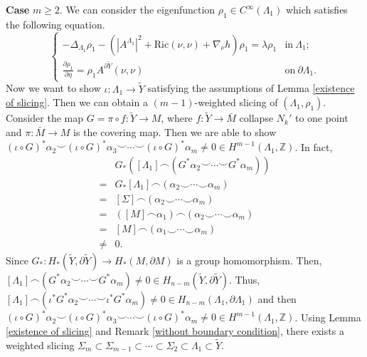 \documentclass[11pt,letterpaper]{amsart}
\theoremstyle{definition}
\theoremstyle{remark}
\numberwithin{equation}{section}
\begin{document}
    \textbf{Case} $m\geq 2$. We can consider the eigenfunction $\rho_{1}\in C^{\infty} (\Lambda_{1})$ which satisfies the following equation.
\[
\left\{
\begin{array}{cc}
     -\Delta_{\Lambda_{1}}\rho_{1}-(|A^{\Lambda_{1}}|^2+\text{Ric}(\nu,\nu)+\nabla_{\nu}h)\rho_{1} = \lambda \rho_{1} & \text{in}\ \Lambda_{1}; \\
     \frac{\partial \rho_{1}}{\partial \eta} = \rho_{1}A^{\partial \tilde{Y}}(\nu,\nu)& \text{on}\ \partial \Lambda_{1} .
\end{array}\right.
\]
Now we want to show $\iota:\Lambda_{1}\rightarrow \tilde{Y}$ satisfying the assumptions of Lemma \ref{existence of slicing}. Then we can obtain a $(m-1)$-weighted slicing of $(\Lambda_{1},\rho_{1})$. Consider the map $G=\pi \circ f: \tilde{Y}\rightarrow M$, where $f:\tilde{Y}\rightarrow \bar{M}$ collapse $N_{k}'$ to one point and $\pi:\bar{M}\rightarrow M$ is the covering map.  Then we are able to show $(\iota\circ G)^{*}\alpha_{2}\smile (\iota\circ G)^{*}\alpha_{3}\smile \cdots \smile (\iota\circ G)^{*}\alpha_{m}\neq 0\in H^{m-1}(\Lambda_{1},\mathbb{Z})$. 
In fact,
\[
\begin{aligned}
    & G_{*}([\Lambda_{1}] \frown (G^{*}\alpha_{2}\smile \cdots \smile G^{*}\alpha_{m}))\\
    =& G_{*}[\Lambda_{1}]\frown (\alpha_{2}\smile \cdots \smile \alpha_{m})\\
    =& [\Sigma]\frown (\alpha_{2}\smile \cdots \smile \alpha_{m})\\
    =& ([M]\frown \alpha_1) \frown(\alpha_{2}\smile \cdots \smile \alpha_{m})\\
    =&[M]\frown (\alpha_{1}\smile \cdots \smile \alpha_{m})\\
    \neq & 0.
\end{aligned}
\]
Since $G_{*}: H_{*}(\tilde{Y},\partial \tilde{Y})\rightarrow H_{*}(M,\partial M)$ is a group homomorphism. Then, $[\Lambda_{1}] \frown (G^{*}\alpha_{2}\smile \cdots \smile G^{*}\alpha_{m})\neq 0\in H_{n-m}(\tilde{Y},\partial \tilde{Y})$. Thus, $[\Lambda_{1}] \frown (\iota^{*} G^{*}\alpha_{2}\smile \cdots \smile \iota^{*}G^{*}\alpha_{m})\neq 0\in H_{n-m}(\Lambda_{1},\partial \Lambda_{1})$ and then $(\iota\circ G)^{*}\alpha_{2}\smile (\iota\circ G)^{*}\alpha_{3}\smile \cdots \smile (\iota\circ G)^{*}\alpha_{m}\neq 0\in H^{m-1}(\Lambda_{1},\mathbb{Z})$. Using Lemma \ref{existence of slicing} and Remark \ref{without boundary condition}, there exists a weighted slicing $\Sigma_{m}\subset \Sigma_{m-1}\subset \cdots \subset \Sigma_{2}\subset \Lambda_{1}\subset \tilde{Y}$.
\end{document}
